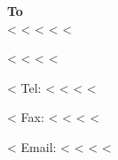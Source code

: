 \parbox[t]{.55\textwidth}{
\textbf{To} \\
<%
<%
<%
<%
<%
}

\vspace*{0.5cm}

<%
<%
<%
\hspace{0.1cm} 
<%

<%
Tel: <%
<%
<%
\hspace{0.1cm}
<%

<%
Fax: <%
<%
<%
\hspace{0.1cm}
<%

<%
Email: <%
<%
<%
\hspace{0.1}
<%
